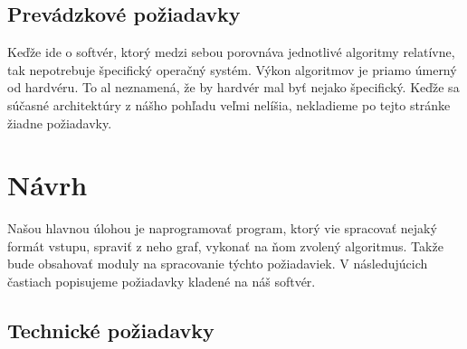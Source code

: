 \subsection{Prevádzkové požiadavky}

Keďže ide o softvér, ktorý medzi sebou porovnáva jednotlivé algoritmy 
relatívne, tak nepotrebuje špecifický operačný systém. Výkon algoritmov je 
priamo úmerný od hardvéru. To al neznamená, že by hardvér mal byť nejako 
špecifický. Keďže sa súčasné architektúry z nášho pohľadu veľmi nelíšia, 
nekladieme po tejto stránke žiadne požiadavky.



\section{Návrh}

Našou hlavnou úlohou je naprogramovať program, ktorý vie spracovať nejaký 
formát vstupu, spraviť z neho graf, vykonať na ňom zvolený algoritmus. Takže 
bude obsahovať moduly na spracovanie týchto požiadaviek. V následujúcich 
častiach popisujeme požiadavky kladené na náš softvér.



\subsection{Technické požiadavky}

